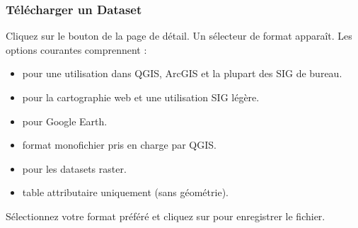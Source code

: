 \documentclass[letterpaper,10pt,english]{sphinxmanual}
\begin{document}
\subsubsection{Télécharger un Dataset}
\label{\detokenize{fr/02_trouver_visualiser:telecharger-un-dataset}}
\sphinxAtStartPar
Cliquez sur le bouton  de la page de détail. Un sélecteur de format
apparaît. Les options courantes comprennent :
\begin{itemize}
\item {} 
\sphinxAtStartPar
{} \textendash{} pour une utilisation dans QGIS, ArcGIS et la plupart des SIG
de bureau.

\item {} 
\sphinxAtStartPar
{} \textendash{} pour la cartographie web et une utilisation SIG légère.

\item {} 
\sphinxAtStartPar
{} \textendash{} pour Google Earth.

\item {} 
\sphinxAtStartPar
{} \textendash{} format mono\sphinxhyphen{}fichier pris en charge par QGIS.

\item {} 
\sphinxAtStartPar
{} \textendash{} pour les datasets raster.

\item {} 
\sphinxAtStartPar
{} \textendash{} table attributaire uniquement (sans géométrie).

\end{itemize}

\sphinxAtStartPar
Sélectionnez votre format préféré et cliquez sur  pour enregistrer le fichier.

\sphinxstepscope
\end{document}
